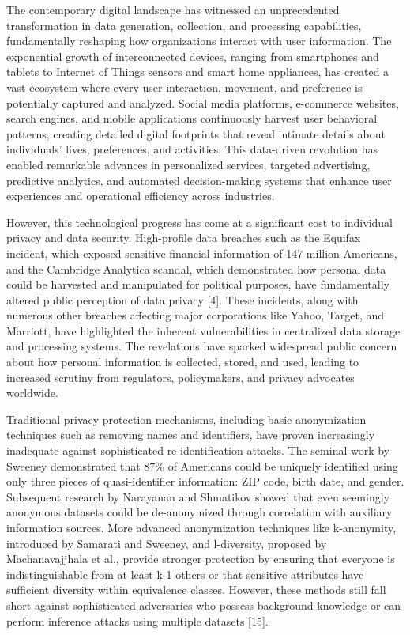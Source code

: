 \documentclass[conference]{IEEEtran}
\begin{document}
The contemporary digital landscape has witnessed an unprecedented transformation in data generation, collection, and processing capabilities, fundamentally reshaping how organizations interact with user information. The exponential growth of interconnected devices, ranging from smartphones and tablets to Internet of Things sensors and smart home appliances, has created a vast ecosystem where every user interaction, movement, and preference is potentially captured and analyzed. Social media platforms, e-commerce websites, search engines, and mobile applications continuously harvest user behavioral patterns, creating detailed digital footprints that reveal intimate details about individuals' lives, preferences, and activities. This data-driven revolution has enabled remarkable advances in personalized services, targeted advertising, predictive analytics, and automated decision-making systems that enhance user experiences and operational efficiency across industries.

However, this technological progress has come at a significant cost to individual privacy and data security. High-profile data breaches such as the Equifax incident, which exposed sensitive financial information of 147 million Americans, and the Cambridge Analytica scandal, which demonstrated how personal data could be harvested and manipulated for political purposes, have fundamentally altered public perception of data privacy [4]. These incidents, along with numerous other breaches affecting major corporations like Yahoo, Target, and Marriott, have highlighted the inherent vulnerabilities in centralized data storage and processing systems. The revelations have sparked widespread public concern about how personal information is collected, stored, and used, leading to increased scrutiny from regulators, policymakers, and privacy advocates worldwide.

Traditional privacy protection mechanisms, including basic anonymization techniques such as removing names and identifiers, have proven increasingly inadequate against sophisticated re-identification attacks. The seminal work by Sweeney demonstrated that 87\% of Americans could be uniquely identified using only three pieces of quasi-identifier information: ZIP code, birth date, and gender. Subsequent research by Narayanan and Shmatikov showed that even seemingly anonymous datasets could be de-anonymized through correlation with auxiliary information sources. More advanced anonymization techniques like k-anonymity, introduced by Samarati and Sweeney, and l-diversity, proposed by Machanavajjhala et al., provide stronger protection by ensuring that everyone is indistinguishable from at least k-1 others or that sensitive attributes have sufficient diversity within equivalence classes. However, these methods still fall short against sophisticated adversaries who possess background knowledge or can perform inference attacks using multiple datasets [15].
\end{document}
